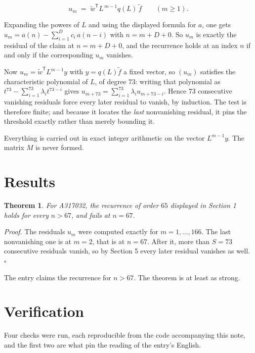 \documentclass[11pt]{article}
\newtheorem{theorem}{Theorem}
\theoremstyle{definition}
\begin{document}
\[u_m \;=\; \tilde w^{\mathsf T} L^{\,m-1} q(L)\,\tilde f \qquad (m \ge 1).\]

Expanding the powers of $L$ and using the displayed formula for $a$, one gets $u_m = a(n) - \sum_{i=1}^{D} c_i\,a(n-i)$ with $n = m + D + 0$. So $u_m$ is exactly the residual of the claim at $n = m + D + 0$, and the recurrence holds at an index $n$ if and only if the corresponding $u_m$ vanishes.

Now $u_m = \tilde w^{\mathsf T} L^{m-1} y$ with $y = q(L)\tilde f$ a fixed vector, so $(u_m)$ satisfies the characteristic polynomial of $L$, of degree $73$: writing that polynomial as $t^{73} - \sum_{i=1}^{73} \lambda_i t^{73-i}$ gives $u_{m+73} = \sum_{i=1}^{73} \lambda_i u_{m+73-i}$. Hence $73$ consecutive vanishing residuals force every later residual to vanish, by induction. The test is therefore finite; and because it locates the {\itshape last} nonvanishing residual, it pins the threshold exactly rather than merely bounding it.

Everything is carried out in exact integer arithmetic on the vector $L^{m-1}y$. The matrix $M$ is never formed.

\section{Results}

\begin{theorem} For A317032, the recurrence of order $65$ displayed in Section 1 holds for every $n > 67$, and fails at $n = 67$.\end{theorem}

{\itshape Proof.} The residuals $u_m$ were computed exactly for $m = 1,\dots,166$. The last nonvanishing one is at $m = 2$, that is at $n = 67$. After it, more than $S = 73$ consecutive residuals vanish, so by Section 5 every later residual vanishes as well. $\square$

The entry claims the recurrence for $n > 67$. The theorem is at least as strong.

\section{Verification}

Four checks were run, each reproducible from the code accompanying this note, and the first two are what pin the reading of the entry's English.
\end{document}

